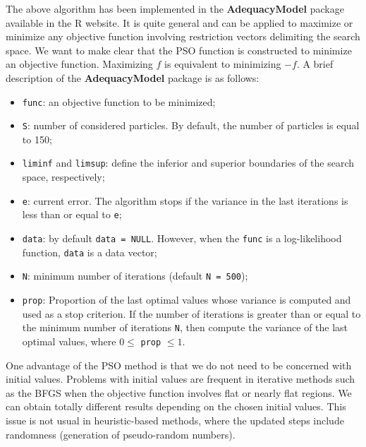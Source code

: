 \documentclass[10pt,letterpaper]{article}
\begin{document}
The above algorithm has been implemented in the \textbf{AdequacyModel} package available in the \textsc{R} website.
It is quite general and can be applied to maximize
or minimize any objective function involving  restriction vectors delimiting the search space.
We want to make clear
that the PSO function is constructed to minimize an objective function.
Maximizing $f$ is equivalent to minimizing $-f$.
A brief description of the \textbf{AdequacyModel} package is as follows:
\begin{itemize}

\item
\texttt{func}: an objective function to be minimized;

\item
\texttt{S}: number of considered particles.
By default, the number of particles is equal to 150;

\item
\texttt{lim\textunderscore inf} and \texttt{lim\textunderscore  sup}: define the inferior and superior boundaries of the search space, res\-pec\-ti\-ve\-ly;

\item
\texttt{e}: current error.
The algorithm stops if the variance in the last iterations is less than or equal to \texttt{e};

\item
\texttt{data}: by default \texttt{data = NULL}.
However, when the \texttt{func} is a log-likelihood function, \texttt{data} is a data vector;

\item
\texttt{N}: minimum number of iterations (default \texttt{N = 500});

\item
\texttt{prop}: Proportion of the last optimal values whose variance is computed and used as a stop criterion.
If the number of iterations is greater than or equal to the minimum number of iterations \texttt{N},
then compute the variance of the last optimal values, where $0\leq$ \texttt{prop} $\leq 1$.

\end{itemize}
One advantage of the PSO method is that we do not need to be concerned with initial values.
Problems with initial values are frequent
in iterative methods such as the BFGS when the objective function involves flat or nearly flat regions.
We can obtain totally different
results depending on the chosen initial values.
This  issue is not usual in heuristic-based methods, where the updated steps include
randomness (generation of pseudo-random numbers).
\end{document}
